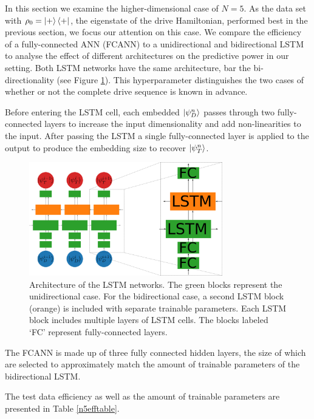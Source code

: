 In this section we examine the higher-dimensional case of $N=5$.
As the data set with $\rho_0 = \ket{+} \bra{+}$, the eigenstate of the drive Hamiltonian, performed best in the previous section, we focus our attention on this case.
We compare the efficiency of a fully-connected ANN (FCANN) to a unidirectional and bidirectional LSTM to analyse the effect of different architectures on the predictive power in our setting.
Both LSTM networks have the same architecture, bar the bi-directionality (see Figure \ref{lstm_network}).
This hyperparameter distinguishes the two cases of whether or not the complete drive sequence is known in advance.

Before entering the LSTM cell, each embedded $\ket{\psi_D^n}$ passes through two fully-connected layers to increase the input dimensionality and add non-linearities to the input.
After passing the LSTM a single fully-connected layer is applied to the output to produce the embedding size to recover $\ket{\psi_T^n}$.

\begin{figure}[h]
	\centering
	\includegraphics[width=0.75\textwidth]{img/lstm_network}
	\caption{Architecture of the LSTM networks. The green blocks represent the unidirectional case. For the bidirectional case, a second LSTM block (orange) is included with separate trainable parameters. Each LSTM block includes multiple layers of LSTM cells. The blocks labeled `FC' represent fully-connected layers.}
	\label{lstm_network}
\end{figure}

The FCANN is made up of three fully connected hidden layers, the size of which are selected to approximately match the amount of trainable parameters of the bidirectional LSTM.

The test data efficiency as well as the amount of trainable parameters are presented in Table \ref{n5efftable}.

